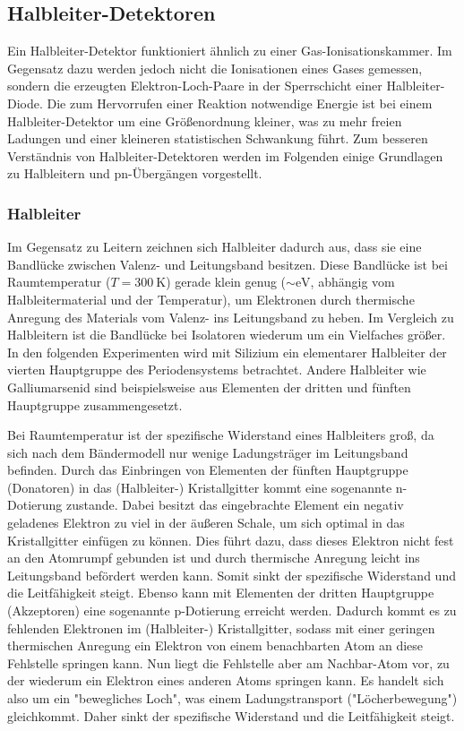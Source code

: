\subsection{Halbleiter-Detektoren}

Ein Halbleiter-Detektor funktioniert ähnlich zu einer Gas-Ionisationskammer.
Im Gegensatz dazu werden jedoch nicht die Ionisationen eines Gases gemessen, sondern die erzeugten Elektron-Loch-Paare in der Sperrschicht einer Halbleiter-Diode.
Die zum Hervorrufen einer Reaktion notwendige Energie ist bei einem Halbleiter-Detektor um eine Größenordnung kleiner, was zu mehr freien Ladungen und einer kleineren statistischen Schwankung führt.
Zum besseren Verständnis von Halbleiter-Detektoren werden im Folgenden einige Grundlagen zu Halbleitern und pn-Übergängen vorgestellt.

\subsubsection{Halbleiter}

Im Gegensatz zu Leitern zeichnen sich Halbleiter dadurch aus, dass sie eine Bandlücke zwischen Valenz- und Leitungsband besitzen.
Diese Bandlücke ist bei Raumtemperatur ($T=\SI{300}{\kelvin}$) gerade klein genug ($\sim \si{\electronvolt}$, abhängig vom Halbleitermaterial und der Temperatur), um Elektronen durch thermische Anregung des Materials vom Valenz- ins Leitungsband zu heben.
Im Vergleich zu Halbleitern ist die Bandlücke bei Isolatoren wiederum um ein Vielfaches größer.
In den folgenden Experimenten wird mit Silizium ein elementarer Halbleiter der vierten Hauptgruppe des Periodensystems betrachtet.
Andere Halbleiter wie Galliumarsenid sind beispielsweise aus Elementen der dritten und fünften Hauptgruppe zusammengesetzt.

Bei Raumtemperatur ist der spezifische Widerstand eines Halbleiters groß, da sich nach dem Bändermodell nur wenige Ladungsträger im Leitungsband befinden.
Durch das Einbringen von Elementen der fünften Hauptgruppe (Donatoren) in das (Halbleiter-) Kristallgitter kommt eine sogenannte n-Dotierung zustande.
Dabei besitzt das eingebrachte Element ein negativ geladenes Elektron zu viel in der äußeren Schale, um sich optimal in das Kristallgitter einfügen zu können.
Dies führt dazu, dass dieses Elektron nicht fest an den Atomrumpf gebunden ist und durch thermische Anregung leicht ins Leitungsband befördert werden kann.
Somit sinkt der spezifische Widerstand und die Leitfähigkeit steigt.
Ebenso kann mit Elementen der dritten Hauptgruppe (Akzeptoren) eine sogenannte p-Dotierung erreicht werden.
Dadurch kommt es zu fehlenden Elektronen im (Halbleiter-) Kristallgitter, sodass mit einer geringen thermischen Anregung ein Elektron von einem benachbarten Atom an diese Fehlstelle springen kann.
Nun liegt die Fehlstelle aber am Nachbar-Atom vor, zu der wiederum ein Elektron eines anderen Atoms springen kann.
Es handelt sich also um ein "bewegliches Loch", was einem Ladungstransport ("Löcherbewegung") gleichkommt.
Daher sinkt der spezifische Widerstand und die Leitfähigkeit steigt.


